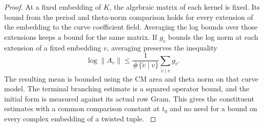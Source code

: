 \begin{proof}
At a fixed embedding of \(K\), the algebraic matrix of each
kernel is fixed. Its bound from the period and theta-norm
comparison holds for every extension of the embedding to the
curve coefficient field. Averaging the log bounds over those
extensions keeps a bound for the same matrix.
If \(g_{\tilde v}\) bounds the log norm at each extension of a fixed embedding \(v\), averaging preserves the inequality
\[
  \log\|A_v\|\le \frac{1}{\#\{\tilde v\mid v\}}\sum_{\tilde v\mid v}g_{\tilde v}.
\]
 The resulting
mean is bounded using the CM area and theta norm on that
curve model. The terminal branching estimate is a squared
operator bound, and the initial form is measured against
its actual row Gram. This gives the constituent estimates
with a common comparison constant at \(t_0\) and no need
for a bound on every complex embedding of a twisted tuple.
\label{cor:fitted-evaluation-6}
\end{proof}
